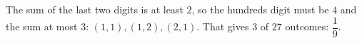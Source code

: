 The sum of the last two digits is at least $2$, so the hundreds digit must be $4$ and the sum at most $3$: $(1,1),(1,2),(2,1)$. That gives $3$ of $27$ outcomes: $\boxed{\dfrac19}$.

